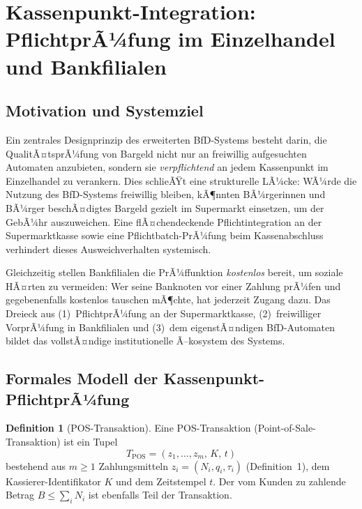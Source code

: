 ﻿\documentclass[a4paper,12pt]{article}
\theoremstyle{definition}
\newtheorem{definition}{Definition}
\begin{document}
\section{Kassenpunkt-Integration: PflichtprÃ¼fung im Einzelhandel und Bankfilialen}
\label{sec:pos}

\subsection{Motivation und Systemziel}

Ein zentrales Designprinzip des erweiterten BfD-Systems besteht darin,
die QualitÃ¤tsprÃ¼fung von Bargeld nicht nur an freiwillig aufgesuchten
Automaten anzubieten, sondern sie \emph{verpflichtend} an jedem Kassenpunkt
im Einzelhandel zu verankern.  Dies schlieÃŸt eine strukturelle LÃ¼cke:
WÃ¼rde die Nutzung des BfD-Systems freiwillig bleiben, kÃ¶nnten BÃ¼rgerinnen und
BÃ¼rger beschÃ¤digtes Bargeld gezielt im Supermarkt einsetzen, um der GebÃ¼hr
auszuweichen.  Eine flÃ¤chendeckende Pflichtintegration an der Supermarktkasse
sowie eine Pflichtbatch-PrÃ¼fung beim Kassenabschluss verhindert dieses
Ausweichverhalten systemisch.

Gleichzeitig stellen Bankfilialen die PrÃ¼ffunktion \emph{kostenlos} bereit,
um soziale HÃ¤rten zu vermeiden: Wer seine Banknoten vor einer Zahlung prÃ¼fen
und gegebenenfalls kostenlos tauschen mÃ¶chte, hat jederzeit Zugang dazu.
Das Dreieck aus (1)~PflichtprÃ¼fung an der Supermarktkasse,
(2)~freiwilliger VorprÃ¼fung in Bankfilialen und
(3)~dem eigenstÃ¤ndigen BfD-Automaten bildet das vollstÃ¤ndige institutionelle
Ã–kosystem des Systems.

\subsection{Formales Modell der Kassenpunkt-PflichtprÃ¼fung}

\begin{definition}[POS-Transaktion]
\label{def:pos}
Eine POS-Transaktion (Point-of-Sale-Transaktion) ist ein Tupel
\[
T_{\text{POS}} = (z_1,\ldots,z_m,\, K,\, t)
\]
bestehend aus $m \geq 1$ Zahlungsmitteln $z_i = (N_i, q_i, \tau_i)$
(Definition~1), dem Kassierer-Identifikator $K$ und dem Zeitstempel $t$.
Der vom Kunden zu zahlende Betrag $B \leq \sum_i N_i$ ist ebenfalls Teil
der Transaktion.
\end{definition}
\end{document}

